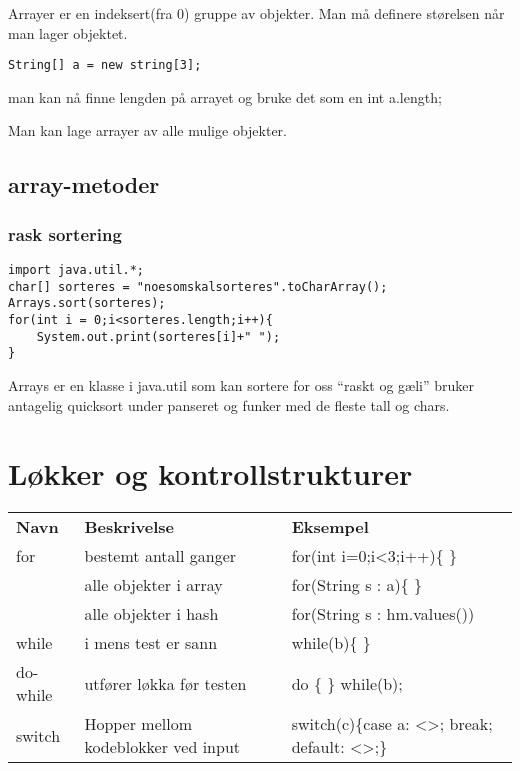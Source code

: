 \documentclass[a4paper,norsk,10pt]{article}
\begin{document}
  Arrayer er en indeksert(fra 0) gruppe av objekter. Man må definere
  størelsen når man lager objektet.
\begin{verbatim}
String[] a = new string[3];
\end{verbatim}
  man kan nå finne lengden på arrayet og bruke det som en int a.length;

  Man kan lage arrayer av alle mulige objekter.
\subsection{array-metoder}
\label{sec-4.1}
\subsubsection{rask sortering}
\label{sec-4.1.1}

\begin{verbatim}
import java.util.*;
char[] sorteres = "noesomskalsorteres".toCharArray();
Arrays.sort(sorteres);
for(int i = 0;i<sorteres.length;i++){
    System.out.print(sorteres[i]+" ");
}
\end{verbatim}

Arrays er en klasse i java.util som kan sortere for oss ``raskt og gæli''
bruker antagelig quicksort under panseret og funker med de fleste tall og 
chars.
\section{Løkker og kontrollstrukturer}
\label{sec-5}



\begin{center}
\begin{tabular}{lll}
 \textbf{Navn}  &  \textbf{Beskrivelse}                 &  \textbf{Eksempel}                             \\
 for            &  bestemt antall ganger                &  for(int i=0;i<3;i++)\{ \}                     \\
                &  alle objekter i array                &  for(String s : a)\{ \}                        \\
                &  alle objekter i hash                 &  for(String s : hm.values())                   \\
 while          &  i mens test er sann                  &  while(b)\{ \}                                 \\
 do-while       &  utfører løkka før testen             &  do \{ \} while(b);                            \\
 switch         &  Hopper mellom kodeblokker ved input  &  switch(c)\{case a: <>; break; default: <>;\}  \\
\end{tabular}
\end{center}
\end{document}
